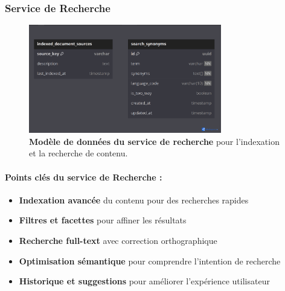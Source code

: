 \subsubsection{Service de Recherche}
\begin{figure}[H]
  \centering
  \includegraphics[width=0.75\textwidth,keepaspectratio]{week_1_img/services_db_screanshots/Screenshot 2025-06-06 at 15-08-52 Search_Service.pdf.png}
  \caption{\textbf{Modèle de données du service de recherche} pour l'indexation et la recherche de contenu.}
  \label{fig:search_service}
\end{figure}

\small
\paragraph{Points clés du service de Recherche :}
\begin{itemize}[leftmargin=*,noitemsep,topsep=0pt]
  \item \textbf{Indexation avancée} du contenu pour des recherches rapides
  \item \textbf{Filtres et facettes} pour affiner les résultats
  \item \textbf{Recherche full-text} avec correction orthographique
  \item \textbf{Optimisation sémantique} pour comprendre l'intention de recherche
  \item \textbf{Historique et suggestions} pour améliorer l'expérience utilisateur
\end{itemize}
\normalsize

